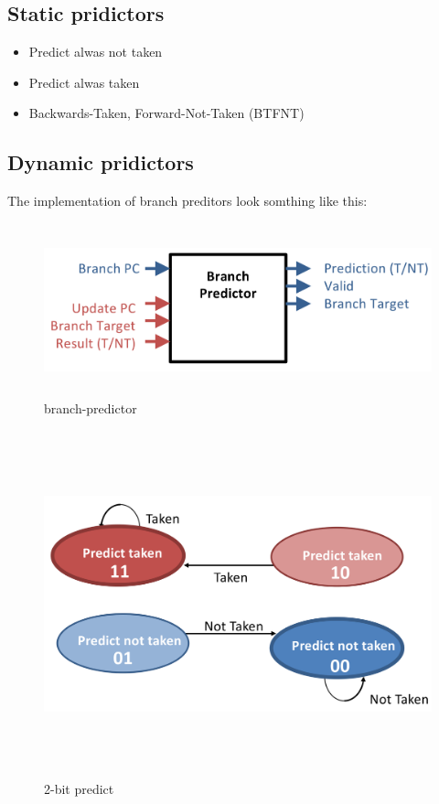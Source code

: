 \documentclass{article}
\begin{document}
\subsection{Static pridictors}
\begin{itemize}
\item  Predict alwas not taken
\item  Predict alwas taken
\item  Backwards-Taken, Forward-Not-Taken (BTFNT)
\end{itemize}


\newpage


\subsection{Dynamic pridictors}

The implementation of branch preditors look somthing like this:
\begin{figure}[h]
    \vspace{10mm}
    \centering
    \includegraphics[width=16cm, height=5cm]{image/branch-predictor.png} 
    \caption{branch-predictor}
\end{figure}


\begin{figure}[h]
    \vspace{10mm}
    \centering
    \includegraphics[width=16cm, height=10cm]{image/2-bit-predict.png} 
    \caption{2-bit predict}
\end{figure}
\end{document}
